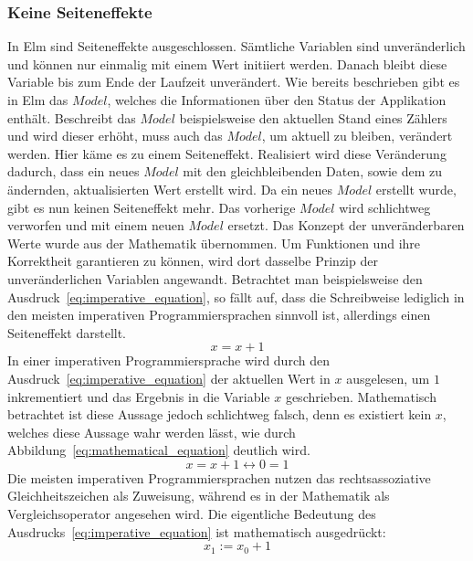\subsubsection{Keine Seiteneffekte}
\label{sec:Keine Seiteneffekte}
In Elm sind Seiteneffekte ausgeschlossen. Sämtliche Variablen sind unveränderlich und können nur einmalig mit einem Wert initiiert werden. Danach bleibt diese Variable bis zum Ende der Laufzeit unverändert. Wie bereits beschrieben gibt es in Elm das $Model$, welches die Informationen über den Status der Applikation enthält. Beschreibt das $Model$ beispielsweise den aktuellen Stand eines Zählers und wird dieser erhöht, muss auch das $Model$, um aktuell zu bleiben, verändert werden. Hier käme es zu einem Seiteneffekt. Realisiert wird diese Veränderung dadurch, dass ein neues $Model$ mit den gleichbleibenden Daten, sowie dem zu ändernden, aktualisierten Wert erstellt wird. Da ein neues $Model$ erstellt wurde, gibt es nun keinen Seiteneffekt mehr. Das vorherige $Model$ wird schlichtweg verworfen und mit einem neuen $Model$ ersetzt.
Das Konzept der unveränderbaren Werte wurde aus der Mathematik übernommen.  Um Funktionen und ihre Korrektheit garantieren zu können, wird dort dasselbe Prinzip der unveränderlichen Variablen angewandt. Betrachtet man beispielsweise den Ausdruck~\ref{eq:imperative_equation}, so fällt auf, dass die Schreibweise lediglich in den meisten imperativen Programmiersprachen sinnvoll ist, allerdings einen Seiteneffekt darstellt.
\begin{equation} \label{eq:imperative_equation}
x = x + 1
\end{equation}
In einer imperativen Programmiersprache wird durch den Ausdruck~\ref{eq:imperative_equation} der aktuellen Wert in $x$ ausgelesen, um $1$ inkrementiert und das Ergebnis in die Variable $x$ geschrieben.
Mathematisch betrachtet ist diese Aussage jedoch schlichtweg falsch, denn es existiert kein $x$, welches diese Aussage wahr werden lässt, wie durch Abbildung~\ref{eq:mathematical_equation} deutlich wird.
\begin{equation} \label{eq:mathematical_equation}
x=x+1 \leftrightarrow 0=1
\end{equation}
Die meisten imperativen Programmiersprachen nutzen das rechtsassoziative Gleichheitszeichen als Zuweisung, während es in der Mathematik als Vergleichsoperator angesehen wird.
Die eigentliche Bedeutung des Ausdrucks~\ref{eq:imperative_equation} ist mathematisch ausgedrückt:
\begin{equation} \label{eq:true_equation}
x_1:= x_0 + 1
\end{equation}
